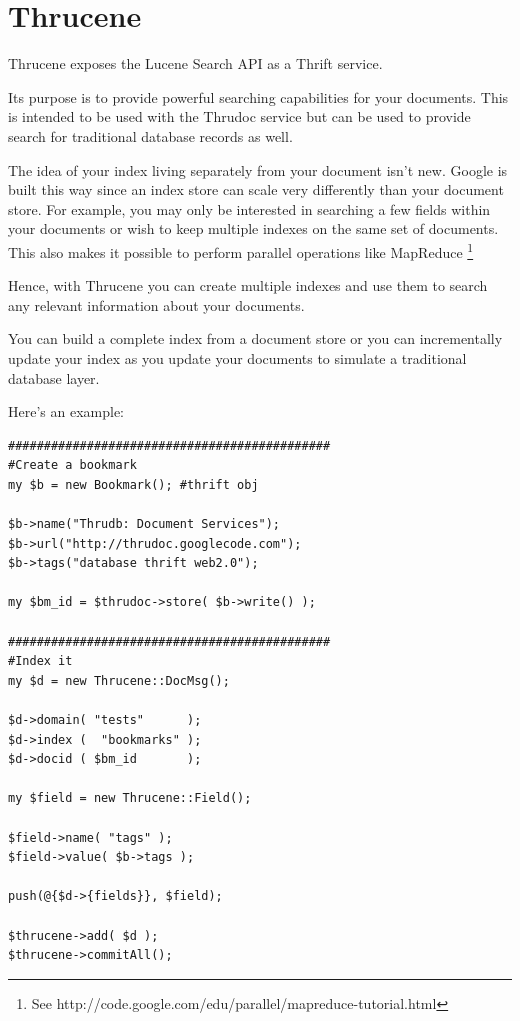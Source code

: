 \documentclass[nocopyrightspace,blockstyle]{sigplanconf}
\begin{document}
\section{Thrucene}

Thrucene exposes the Lucene Search API as a Thrift service.

Its purpose is to provide powerful searching capabilities for your documents.
This is intended to be used with the Thrudoc service but can be used to provide search for traditional database records as well.

The idea of your index living separately from your document isn't new.
Google is built this way since an index store can scale very differently than your document store.
For example, you may only be interested in searching a few fields within your documents or
wish to keep multiple indexes on the same set of documents. This also makes it possible to perform parallel operations like MapReduce
\footnote{See http://code.google.com/edu/parallel/mapreduce-tutorial.html}

Hence, with Thrucene you can create multiple indexes and use them to search any relevant information about your documents.

You can build a complete index from a document store or you can incrementally update your
index as you update your documents to simulate a traditional database layer.

Here's an example:

\begin{verbatim}
#############################################
#Create a bookmark
my $b = new Bookmark(); #thrift obj

$b->name("Thrudb: Document Services");
$b->url("http://thrudoc.googlecode.com");
$b->tags("database thrift web2.0");

my $bm_id = $thrudoc->store( $b->write() );

#############################################
#Index it
my $d = new Thrucene::DocMsg();

$d->domain( "tests"      );
$d->index (  "bookmarks" );
$d->docid ( $bm_id       );

my $field = new Thrucene::Field();

$field->name( "tags" );
$field->value( $b->tags );

push(@{$d->{fields}}, $field);

$thrucene->add( $d );
$thrucene->commitAll();

\end{verbatim}
\end{document}
